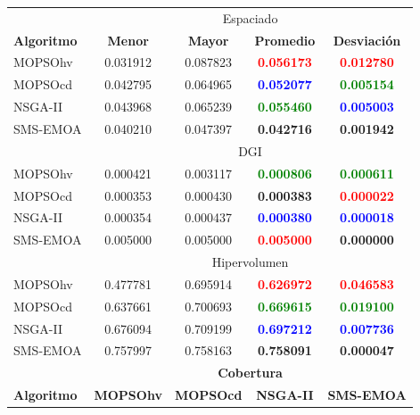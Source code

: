 \clearpage
\newpage

\begin{table}
 \begin{center}
  \begin{tabular}{|l|cc|cc|} \hline
    & \multicolumn{4}{|c|}{Espaciado} \\ 
	\textbf{Algoritmo} & \textbf{Menor} & \textbf{Mayor} & \textbf{Promedio} & \textbf{Desviaci\'on} \\  \hline \hline
	MOPSOhv &0.031912 & 0.087823 &  \textbf{\textcolor{red}{0.056173}} &  \textbf{\textcolor{red}{ 0.012780}}    \\ 
	MOPSOcd &0.042795 & 0.064965 &  \textbf{\textcolor{blue}{0.052077}} &  \textbf{\textcolor{green}{0.005154}}  \\ 
	NSGA-II &0.043968 & 0.065239 &  \textbf{\textcolor{green}{0.055460}} &  \textbf{\textcolor{blue}{0.005003}}   \\  
	SMS-EMOA &0.040210 & 0.047397 & \textbf{0.042716} &  \textbf{0.001942 }  \\  
	\hline\hline
    & \multicolumn{4}{|c|}{DGI} \\ 
	\hline\hline
	MOPSOhv &0.000421 & 0.003117 &  \textbf{\textcolor{green}{0.000806}} &  \textbf{\textcolor{green}{0.000611}}    \\ 
	MOPSOcd &0.000353 & 0.000430 & \textbf{0.000383} & \textbf{\textcolor{red}{ 0.000022}}   \\ 
	NSGA-II &0.000354 & 0.000437 &  \textbf{\textcolor{blue}{0.000380}} &  \textbf{\textcolor{blue}{0.000018}}   \\  
	SMS-EMOA &0.005000 & 0.005000 &  \textbf{\textcolor{red}{0.005000}} &  \textbf{0.000000}   \\  
	\hline\hline
    & \multicolumn{4}{|c|}{Hipervolumen} \\ 
	\hline \hline
	MOPSOhv &0.477781 & 0.695914 &  \textbf{\textcolor{red}{0.626972}} &  \textbf{\textcolor{red}{0.046583}}   \\ 
	MOPSOcd &0.637661 & 0.700693 &  \textbf{\textcolor{green}{0.669615}} &  \textbf{\textcolor{green}{0.019100}}   \\ 
	NSGA-II &0.676094 & 0.709199 &  \textbf{\textcolor{blue}{0.697212}} &  \textbf{\textcolor{blue}{0.007736}}   \\  
	SMS-EMOA &0.757997 & 0.758163 & \textbf{0.758091} &  \textbf{0.000047 }  \\  
	\hline\hline
	& \multicolumn{4}{|c|}{\textbf{Cobertura}} \\ \hline\hline 
	\textbf{Algoritmo} & \textbf{MOPSOhv} & \textbf{MOPSOcd} & \textbf{NSGA-II} & \textbf{SMS-EMOA} \\  \hline \hline

\end{tabular}
\end{center}
\end{table}
